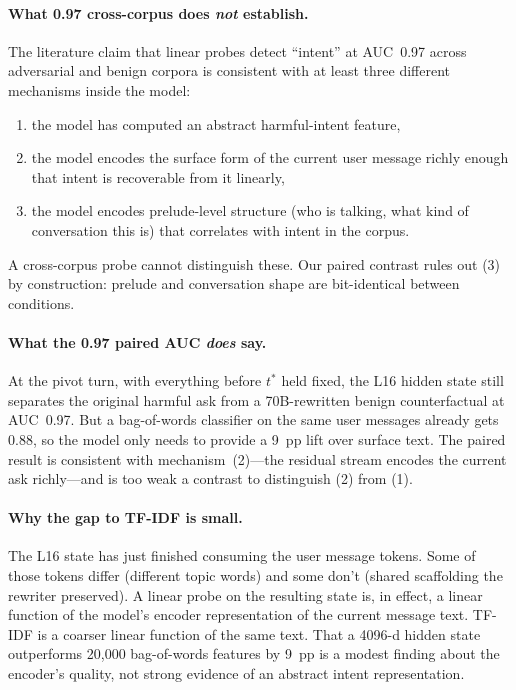 \documentclass[11pt]{article}
\begin{document}
\paragraph{What 0.97 cross-corpus does \emph{not} establish.}
The literature claim that linear probes detect ``intent'' at AUC~0.97 across adversarial and benign corpora is consistent with at least three different mechanisms inside the model:
\begin{enumerate}[leftmargin=*]
  \item the model has computed an abstract harmful-intent feature,
  \item the model encodes the surface form of the current user message richly enough that intent is recoverable from it linearly,
  \item the model encodes prelude-level structure (who is talking, what kind of conversation this is) that correlates with intent in the corpus.
\end{enumerate}
A cross-corpus probe cannot distinguish these.
Our paired contrast rules out (3) by construction: prelude and conversation shape are bit-identical between conditions.

\paragraph{What the 0.97 paired AUC \emph{does} say.}
At the pivot turn, with everything before $t^*$ held fixed, the L16 hidden state still separates the original harmful ask from a 70B-rewritten benign counterfactual at AUC~0.97.
But a bag-of-words classifier on the same user messages already gets 0.88, so the model only needs to provide a 9~pp lift over surface text.
The paired result is consistent with mechanism~(2)---the residual stream encodes the current ask richly---and is too weak a contrast to distinguish (2) from (1).

\paragraph{Why the gap to TF-IDF is small.}
The L16 state has just finished consuming the user message tokens.
Some of those tokens differ (different topic words) and some don't (shared scaffolding the rewriter preserved).
A linear probe on the resulting state is, in effect, a linear function of the model's encoder representation of the current message text.
TF-IDF is a coarser linear function of the same text.
That a 4096-d hidden state outperforms 20{,}000 bag-of-words features by 9~pp is a modest finding about the encoder's quality, not strong evidence of an abstract intent representation.
\end{document}
